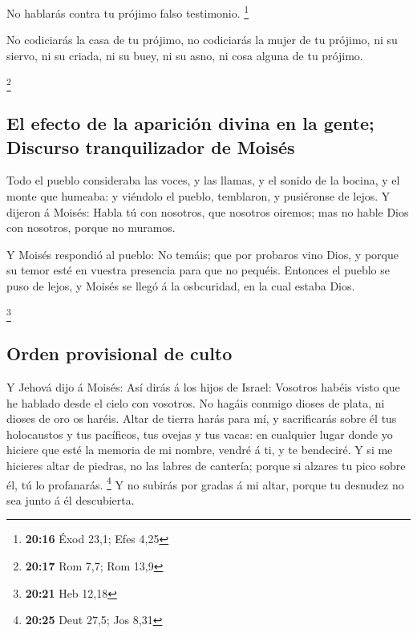  No hablarás contra tu prójimo falso testimonio.
\footnote{\textbf{20:16} Éxod 23,1; Efes 4,25}

 No codiciarás la casa de tu prójimo, no codiciarás la
mujer de tu prójimo, ni su siervo, ni su criada, ni su buey, ni su asno,
ni cosa alguna de tu prójimo.

\footnote{\textbf{20:17} Rom 7,7; Rom 13,9}

\hypertarget{el-efecto-de-la-apariciuxf3n-divina-en-la-gente-discurso-tranquilizador-de-moisuxe9s}{%
\subsection{El efecto de la aparición divina en la gente; Discurso
tranquilizador de
Moisés}\label{el-efecto-de-la-apariciuxf3n-divina-en-la-gente-discurso-tranquilizador-de-moisuxe9s}}

 Todo el pueblo consideraba las voces, y las llamas, y el
sonido de la bocina, y el monte que humeaba: y viéndolo el pueblo,
temblaron, y pusiéronse de lejos.  Y dijeron á Moisés:
Habla tú con nosotros, que nosotros oiremos; mas no hable Dios con
nosotros, porque no muramos.

 Y Moisés respondió al pueblo: No temáis; que por probaros
vino Dios, y porque su temor esté en vuestra presencia para que no
pequéis.  Entonces el pueblo se puso de lejos, y Moisés se
llegó á la osbcuridad, en la cual estaba Dios.

\footnote{\textbf{20:21} Heb 12,18}

\hypertarget{orden-provisional-de-culto}{%
\subsection{Orden provisional de
culto}\label{orden-provisional-de-culto}}

 Y Jehová dijo á Moisés: Así dirás á los hijos de Israel:
Vosotros habéis visto que he hablado desde el cielo con vosotros.
 No hagáis conmigo dioses de plata, ni dioses de oro os
haréis.  Altar de tierra harás para mí, y sacrificarás
sobre él tus holocaustos y tus pacíficos, tus ovejas y tus vacas: en
cualquier lugar donde yo hiciere que esté la memoria de mi nombre,
vendré á ti, y te bendeciré.  Y si me hicieres altar de
piedras, no las labres de cantería; porque si alzares tu pico sobre él,
tú lo profanarás. \footnote{\textbf{20:25} Deut 27,5; Jos 8,31}
 Y no subirás por gradas á mi altar, porque tu desnudez no
sea junto á él descubierta.

